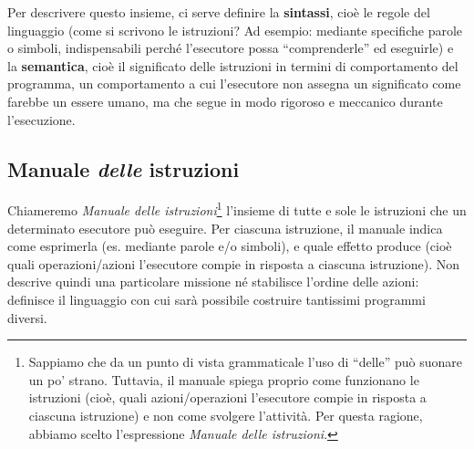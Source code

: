 Per descrivere questo insieme, ci serve definire la \textbf{sintassi}, cioè le regole del linguaggio (come si scrivono le istruzioni? Ad esempio: mediante specifiche parole o simboli, indispensabili perché l'esecutore possa ``comprenderle'' ed eseguirle) e la \textbf{semantica}, cioè il significato delle istruzioni in termini di comportamento del programma, un comportamento a cui l'esecutore non assegna un significato come farebbe un essere umano, ma che segue in modo rigoroso e meccanico durante l'esecuzione.

\subsection{Manuale \textit{delle} istruzioni}\label{manuale-delle-istruzioni}

Chiameremo \emph{Manuale delle istruzioni}\footnote{Sappiamo che da un punto di vista grammaticale l'uso di ``delle'' può suonare un po' strano. Tuttavia, il manuale spiega proprio come funzionano le istruzioni (cioè, quali azioni/operazioni l'esecutore compie in risposta a ciascuna istruzione) e non come svolgere l'attività. Per questa ragione, abbiamo scelto l'espressione \emph{Manuale delle istruzioni}.} l'insieme di tutte e sole le istruzioni che un determinato esecutore può eseguire. Per ciascuna istruzione, il manuale indica come esprimerla (es. mediante parole e/o simboli), e quale effetto produce (cioè quali operazioni/azioni l'esecutore compie in risposta a ciascuna istruzione). Non descrive quindi una particolare missione né stabilisce l'ordine delle azioni: definisce il linguaggio con cui sarà possibile costruire tantissimi programmi diversi.

